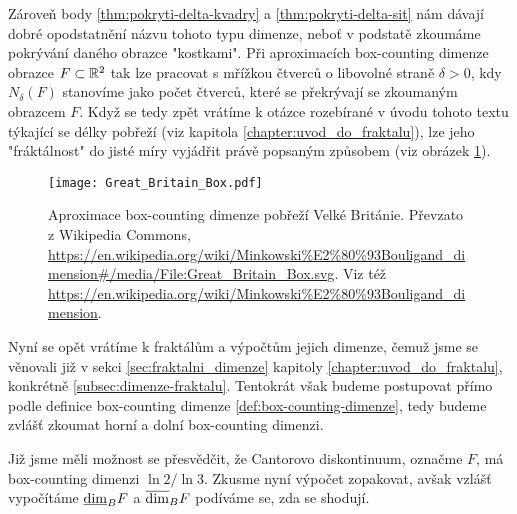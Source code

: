 Zároveň body \ref{thm:pokryti-delta-kvadry} a \ref{thm:pokryti-delta-sit} nám dávají dobré opodstatnění názvu tohoto typu dimenze, neboť v podstatě zkoumáme pokrývání daného obrazce "kostkami". Při aproximacích box-counting dimenze obrazce $F\subset\mathbb{R}^2$ tak lze pracovat s mřížkou čtverců o libovolné straně $\delta>0$, kdy $N_\delta(F)$ stanovíme jako počet čtverců, které se překrývají se zkoumaným obrazcem $F$. Když se tedy zpět vrátíme k otázce rozebírané v úvodu tohoto textu týkající se délky pobřeží (viz kapitola \ref{chapter:uvod_do_fraktalu}), lze jeho "fráktálnost" do jisté míry vyjádřit právě popsaným způsobem (viz obrázek \ref{fig:aproximace-delky-pobrezi-vb}).
\begin{figure}[h]
    \centering
    \texttt{[image: Great\_Britain\_Box.pdf]}
    \caption{Aproximace box-counting dimenze pobřeží Velké Británie. Převzato z Wikipedia Commons, \url{https://en.wikipedia.org/wiki/Minkowski\%E2\%80\%93Bouligand\_dimension\#/media/File:Great\_Britain\_Box.svg}. Viz též \url{https://en.wikipedia.org/wiki/Minkowski\%E2\%80\%93Bouligand\_dimension}.}
    \label{fig:aproximace-delky-pobrezi-vb}
\end{figure}
Nyní se opět vrátíme k fraktálům a výpočtům jejich dimenze, čemuž jsme se věnovali již v sekci \ref{sec:fraktalni_dimenze} kapitoly \ref{chapter:uvod_do_fraktalu}, konkrétně \ref{subsec:dimenze-fraktalu}. Tentokrát však budeme postupovat přímo podle definice box-counting dimenze \ref{def:box-counting-dimenze}, tedy budeme zvlášť zkoumat horní a dolní box-counting dimenzi.
\begin{example}\label{ex:cantorovo-diskontinuum}
    Již jsme měli možnost se přesvědčit, že Cantorovo diskontinuum, označme $F$, má box-counting dimenzi $\ln{2}/\ln{3}$. Zkusme nyní výpočet zopakovat, avšak vzlášť vypočítáme $\underline{\dim}_B{F}$ a $\overline{\dim}_B{F}$ podíváme se, zda se shodují.
\end{example}